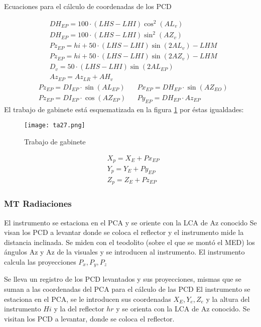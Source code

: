 Ecuaciones para el cálculo de coordenadas de los PCD

\begin{align}
    &DH_{EP}=100\cdot \left(LHS-LHI\right)\cos^2{(AL_v)}\\
    &DH_{EP}=100\cdot (LHS-LHI)\sin^2{(AZ_v)}\\
    &Pz_{EP}=hi+50\cdot (LHS-LHI)\sin{(2AL_v)}-LHM\\
    &Pz_{EP}=hi+50\cdot (LHS-LHI)\sin{(2AZ_v)}-LHM\\
    &D_v=50\cdot (LHS-LHI)\sin{(2AL_{EP})}\\ 
    &Az_{EP}=Az_{LR}+AH_v
\end{align}
\begin{align}
    &Pz_{EP}=DI_{EP}\cdot \sin{(AL_{EP})}&&Px_{EP}=DH_{EP}\cdot \sin{(AZ_{EO})}\\
    &Pz_{EP}=DI_{EP}\cdot \cos{(AZ_{EP})}&&Py_{EP}=DH_{EP}\cdot Az_{EP}
\end{align}
El trabajo de gabinete está esquematizada en la figura \ref{ta27} por éstas igualdades: 

\begin{figure}[h!]
    \centerline{\texttt{[image: ta27.png]}}
    \caption{Trabajo de gabinete}
    \label{ta27}
\end{figure}

\begin{align}
    &X_p=X_E+Px_{EP}\\
    &Y_p=Y_E+Py_{EP}\\
    &Z_p=Z_E+Pz_{EP}
\end{align}
\subsubsection{MT Radiaciones}

El instrumento se estaciona en el PCA y se oriente con la LCA de Az conocido
Se visan los PCD a levantar donde se coloca el reflector y el instrumento mide la distancia inclinada.
Se miden con el teodolito (sobre el que se montó el MED) los ángulos Az y Az de la visuales y se introducen al instrumento. El instrumento calcula las proyecciones $P_x,P_y,P_z$

Se lleva un registro de los PCD levantados y sus proyecciones, mismas que se suman a las coordenadas del PCA para el cálculo de las PCD
El instrumento se estaciona en el PCA, se le introducen sus coordenadas $X_E,Y_e,Z_e$ y la altura del instrumento $Hi$ y la del reflector $hr$ y se orienta con la LCA de Az conocido.
Se visitan los PCD a levantar, donde se coloca el reflector.

